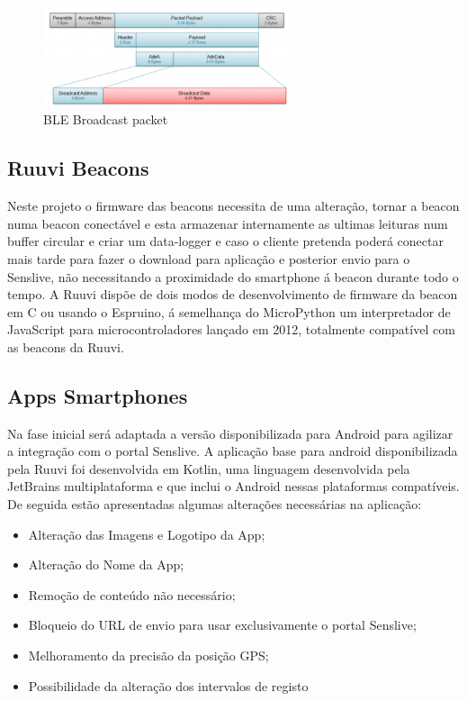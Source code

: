 \begin{figure}[htb]
\centering
\includegraphics[width=0.65\textwidth]{images/blepacket.png}
\caption{BLE Broadcast packet\cite{blepacket}}\label{blepacket}
\end{figure}


\subsection{Ruuvi Beacons}
\par Neste projeto o firmware das beacons necessita de uma alteração, tornar a beacon numa beacon conectável e esta armazenar internamente as ultimas leituras num buffer circular e criar um data-logger e caso o cliente pretenda poderá conectar mais tarde para fazer o download para aplicação e posterior envio para o Senslive, não necessitando a proximidade do smartphone á beacon durante todo o tempo. A Ruuvi dispõe de dois modos de desenvolvimento de firmware da beacon em C ou usando o Espruino, á semelhança do MicroPython um interpretador de JavaScript para microcontroladores lançado em 2012, totalmente compatível com as beacons da Ruuvi.
\subsection{Apps Smartphones}
Na fase inicial será adaptada a versão disponibilizada para Android para agilizar a integração com o portal Senslive. A aplicação base para android disponibilizada pela Ruuvi foi desenvolvida em Kotlin\cite{ruuviappgithub}, uma linguagem desenvolvida pela JetBrains multiplataforma e que inclui o Android nessas plataformas compatíveis.
De seguida estão apresentadas algumas alterações necessárias na aplicação:
\begin{itemize}
\item Alteração das Imagens e Logotipo da App;
\item Alteração do Nome da App;
\item Remoção de conteúdo não necessário;
\item Bloqueio do URL de envio para usar exclusivamente o portal Senslive;
\item Melhoramento da precisão da posição GPS;
\item Possibilidade da alteração dos intervalos de registo
\end{itemize}

